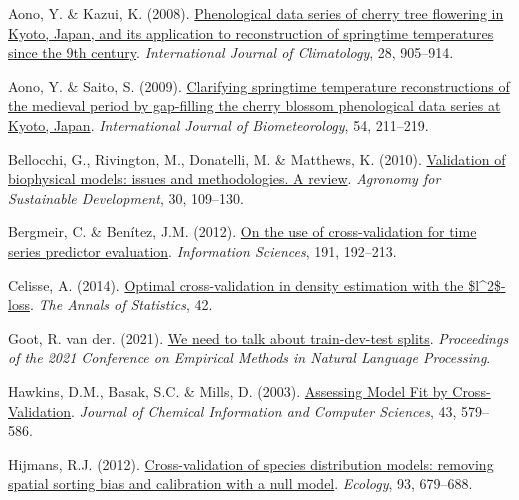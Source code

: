 \documentclass[
  letterpaper,
]{scrbook}
\newlength{\cslhangindent}
\newenvironment{CSLReferences}[2] %
 {\begin{list}{}{%
  \setlength{\itemindent}{0pt}
  \setlength{\leftmargin}{0pt}
  \setlength{\parsep}{0pt}
  \ifodd #1
   \setlength{\leftmargin}{\cslhangindent}
   \setlength{\itemindent}{-1\cslhangindent}
  \fi
  \setlength{\itemsep}{#2\baselineskip}}}
 {\end{list}}
\begin{document}
\label{refs-4}
\begin{CSLReferences}{1}{0}
Aono, Y. \& Kazui, K. (2008).
\href{https://doi.org/10.1002/joc.1594}{Phenological data series of
cherry tree flowering in Kyoto, Japan, and its application to
reconstruction of springtime temperatures since the 9th century}.
\emph{International Journal of Climatology}, 28, 905--914.

Aono, Y. \& Saito, S. (2009).
\href{https://doi.org/10.1007/s00484-009-0272-x}{Clarifying springtime
temperature reconstructions of the medieval period by gap-filling the
cherry blossom phenological data series at Kyoto, Japan}.
\emph{International Journal of Biometeorology}, 54, 211--219.

Bellocchi, G., Rivington, M., Donatelli, M. \& Matthews, K. (2010).
\href{https://doi.org/10.1051/agro/2009001}{Validation of biophysical
models: issues and methodologies. A review}. \emph{Agronomy for
Sustainable Development}, 30, 109--130.

Bergmeir, C. \& Benítez, J.M. (2012).
\href{https://doi.org/10.1016/j.ins.2011.12.028}{On the use of
cross-validation for time series predictor evaluation}.
\emph{Information Sciences}, 191, 192--213.

Celisse, A. (2014). \href{https://doi.org/10.1214/14-aos1240}{Optimal
cross-validation in density estimation with the
{\$}l{\^{}}{\textbraceleft}2{\textbraceright}{\$}-loss}. \emph{The
Annals of Statistics}, 42.

Goot, R. van der. (2021).
\href{https://doi.org/10.18653/v1/2021.emnlp-main.368}{We need to talk
about train-dev-test splits}. \emph{Proceedings of the 2021 Conference
on Empirical Methods in Natural Language Processing}.

Hawkins, D.M., Basak, S.C. \& Mills, D. (2003).
\href{https://doi.org/10.1021/ci025626i}{Assessing Model Fit by
Cross-Validation}. \emph{Journal of Chemical Information and Computer
Sciences}, 43, 579--586.

Hijmans, R.J. (2012).
\href{https://doi.org/10.1890/11-0826.1}{Cross-validation of species
distribution models: removing spatial sorting bias and calibration with
a null model}. \emph{Ecology}, 93, 679--688.


\end{CSLReferences}
\end{document}
